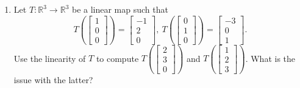 \documentclass[12pt]{amsart}
\newcommand{\R}{\mathbb{R}}
\begin{document}
\begin{enumerate}
\item
 Let $T\colon\R^3\to\R^3$ be a linear map such that 
\[ T(\left[\begin{matrix} 1 \\ 0 \\ 0 \end{matrix}\right]) = \left[\begin{matrix} -1 \\ 2 \\ 0 \end{matrix}\right],\ T(\left[\begin{matrix} 0 \\ 1 \\ 0 \end{matrix}\right]) = \left[\begin{matrix} -3 \\ 0 \\ 1 \end{matrix}\right]. \]
  Use the linearity of $T$ to compute $T(\left[\begin{matrix} 2 \\ 3 \\ 0 \end{matrix}\right])$ and
 $T(\left[\begin{matrix} 1 \\ 2 \\ 3 \end{matrix}\right])$.
 What is the issue with the latter?



\end{enumerate}
\end{document}
